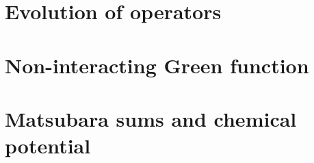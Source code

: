 








\section{Evolution of operators}


\section{Non-interacting Green function}


\section{Matsubara sums and chemical potential}
%


